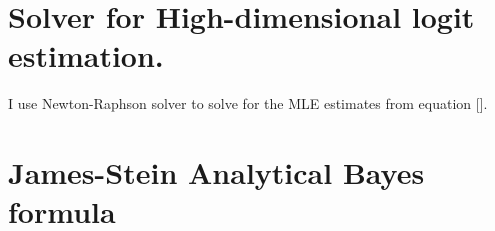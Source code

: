 \section{Solver for High-dimensional logit estimation.}
I use Newton-Raphson solver to solve for the MLE estimates from equation []. 

\section{James-Stein Analytical Bayes formula}